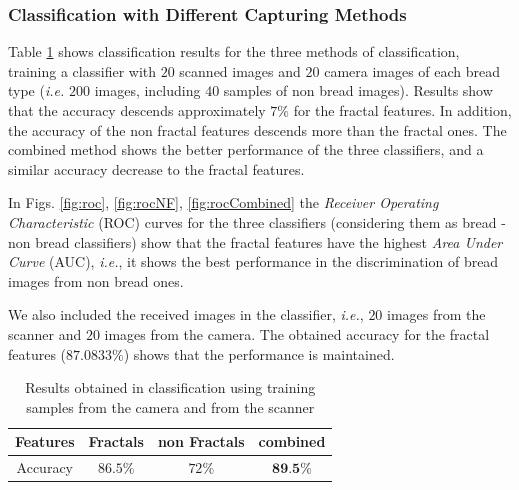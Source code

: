 \documentclass[oneside,a4paper,english,links]{amca}
\begin{document}
\subsubsection{Classification with Different Capturing Methods}
Table \ref{table:tableRobustnessTest1} shows classification results for the three methods of classification, training a classifier with $20$ scanned images and $20$ camera images of each bread type ({\em i.e.} $200$ images, including $40$ samples of non bread images). Results show that the accuracy descends approximately $7\%$ for the fractal features. In addition, the accuracy of the non fractal features descends more than the fractal ones. The combined method shows the better performance of the three classifiers, and a similar accuracy decrease to the fractal features.

In Figs. \ref{fig:roc}, \ref{fig:rocNF}, \ref{fig:rocCombined} the {\em Receiver Operating Characteristic} (ROC) curves for the three classifiers (considering them as bread - non bread classifiers) show that the fractal features have the highest {\em Area Under Curve} (AUC), {\em i.e.}, it shows the best performance in the discrimination of bread images from non bread ones.

We also included the received images in the classifier, {\em i.e.}, $20$ images from the scanner and $20$ images from the camera. The obtained accuracy for the fractal features ($87.0833\%$) shows that the performance is maintained.

\begin{table}[htb]
\centering
\begin{tabular}{|c|c|c|c|}
    \hline
    Features & Fractals & non Fractals & combined\\
    \hline
    \hline
    Accuracy  & $86.5\%$ & $72\%$ & $\textbf{89.5\%}$\\
    \hline
\end{tabular}
\caption{Results obtained in classification using training samples from the camera and from the scanner}
\label{table:tableRobustnessTest1}
\end{table}
\end{document}

